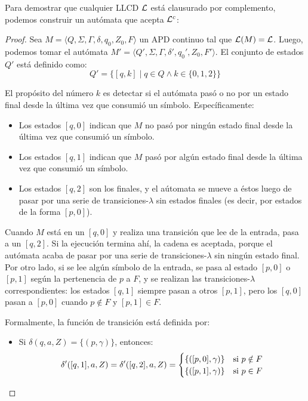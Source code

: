 Para demostrar que cualquier LLCD $\mathcal{L}$ está clausurado por complemento, podemos construir un autómata que acepta $\mathcal{L}^c$:

\begin{proof}
    Sea $M = \langle Q, \Sigma, \Gamma, \delta, q_0, Z_0, F \rangle$ un APD continuo tal que $\mathcal{L}(M) = \mathcal{L}$. Luego, podemos tomar el autómata $M' = \langle Q', \Sigma, \Gamma, \delta', q_0', Z_0, F' \rangle$. El conjunto de estados $Q'$ está definido como:
    $$
        Q' = \{[q, k] \mid q \in Q \land k \in \{0, 1, 2\}\}
    $$

    El propósito del número $k$ es detectar si el autómata pasó o no por un estado final desde la última vez que consumió un símbolo. Específicamente:
    \begin{itemize}
        \item Los estados $[q, 0]$ indican que $M$ no pasó por ningún estado final desde la última vez que consumió un símbolo.
        \item Los estados $[q, 1]$ indican que $M$ pasó por algún estado final desde la última vez que consumió un símbolo.
        \item Los estados $[q, 2]$ son los finales, y el aútomata se mueve a éstos luego de pasar por una serie de transiciones-$\lambda$ sin estados finales (es decir, por estados de la forma $[p, 0]$).
    \end{itemize}

    Cuando $M$ está en un $[q, 0]$ y realiza una transición que lee de la entrada, pasa a un $[q, 2]$. Si la ejecución termina ahí, la cadena es aceptada, porque el autómata acaba de pasar por una serie de transiciones-$\lambda$ sin ningún estado final. Por otro lado, si se lee algún símbolo de la entrada, se pasa al estado $[p, 0]$ o $[p, 1]$ según la pertenencia de $p$ a $F$, y se realizan las transiciones-$\lambda$ correspondientes: los estados $[q, 1]$ siempre pasan a otros $[p, 1]$, pero los $[q, 0]$ pasan a $[p, 0]$ cuando $p \notin F$ y $[p, 1] \in F$.

    Formalmente, la función de transición está definida por:
    \begin{itemize}
        \item Si $\delta(q, a, Z) = \{(p, \gamma)\}$, entonces:
        $$
            \delta'([q, 1], a, Z) = \delta'([q, 2], a, Z) =
            \begin{cases}
                \{([p, 0], \gamma)\} & \text{si } p \notin F \\
                \{([p, 1], \gamma)\} & \text{si } p \in F
            \end{cases}
        $$


\end{itemize}
\end{proof}
